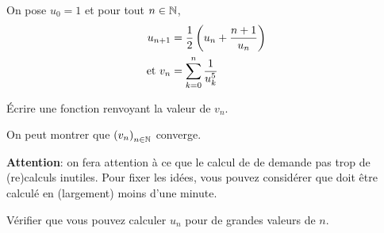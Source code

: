  On pose $u_{0} = 1$ et pour tout $n\in \mathbb{N}$,
\begin{align*}
  u_{n+1} &= \frac{1}{2}\left( u_{n}+\frac{n+1}{u_{n}}\right)\\
\text{et } v_{n} &= \sum_{k=0}^{n} \frac{1}{u_{k}^{5}}
\end{align*}

\question{} Écrire une fonction  renvoyant la valeur de
  $v_{n}$.

On peut montrer que $\left( v_{n}\right)_{n\in \mathbb{N}}$ converge.

\textbf{Attention}: on fera attention à ce que le calcul de 
de demande  pas trop de (re)calculs inutiles. Pour fixer les idées,
vous  pouvez considérer  que   doit être calculé  en
(largement) moins d'une minute.

\question{} Vérifier que vous pouvez calculer $u_{n}$ pour de grandes valeurs de $n$.

